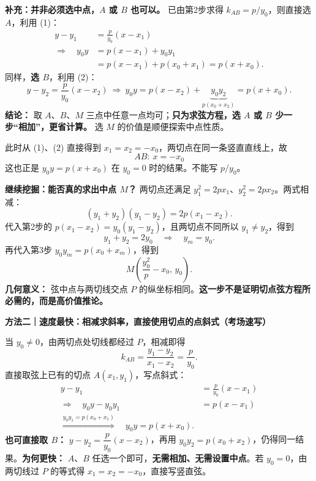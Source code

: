 \begin{proofbox}
\begin{description}[style=nextline,leftmargin=2.8em,labelsep=0.5em,itemsep=0.5em]
\textbf{补充：并非必须选中点，$A$ 或 $B$ 也可以。} 已由第2步求得 $k_{AB}=p/y_0$，则直接选 $A$，利用 (1)：
\[
 \begin{aligned}
 y-y_1&=\frac p{y_0}(x-x_1)\\
 \Longrightarrow\quad y_0y&=p(x-x_1)+y_0y_1\\
 &=p(x-x_1)+p(x_0+x_1)=\boxed{p(x+x_0)}.
 \end{aligned}
\]
同样，\textbf{选 $B$}，利用 (2)：
\[
 y-y_2=\frac p{y_0}(x-x_2)
 \ \Longrightarrow\ y_0y=p(x-x_2)+\underbrace{y_0y_2}_{p(x_0+x_2)}
 =\boxed{p(x+x_0)}.
\]
\textbf{结论：} 取 $A$、$B$、$M$ 三点中任意一点均可；\textbf{只为求弦方程，选 $A$ 或 $B$ 少一步“相加”，更省计算。} 选 $M$ 的价值是顺便探索中点性质。
\item[\textbf{第5步：补上 $y_0=0$ 的竖直弦。}]
此时从 (1)、(2) 直接得到 $x_1=x_2=-x_0$，两切点在同一条竖直直线上，故
\[\boxed{AB:\ x=-x_0}\]
这也正是 $y_0y=p(x+x_0)$ 在 $y_0=0$ 时的结果。不能写 $p/y_0$。
\end{description}

\textbf{继续挖掘：能否真的求出中点 $M$？} 两切点还满足 $y_1^2=2px_1$、$y_2^2=2px_2$。两式相减：
\[
 (y_1+y_2)(y_1-y_2)=2p(x_1-x_2).
\]
代入第2步的 $p(x_1-x_2)=y_0(y_1-y_2)$，且两切点不同所以 $y_1\ne y_2$，得到
\[
 y_1+y_2=2y_0\quad\Longrightarrow\quad\boxed{y_m=y_0}.
\]
再代入第3步 $y_0y_m=p(x_0+x_m)$，得到
\[
 \boxed{M\left(\frac{y_0^2}{p}-x_0,\,y_0\right)}.
\]
\textbf{几何意义：} 弦中点与两切线交点 $P$ 的纵坐标相同。\textbf{这一步不是证明切点弦方程所必需的，而是高价值推论。}

\medskip
\par\noindent\begin{minipage}{\linewidth}
\textbf{\textcolor{CProof}{方法二｜速度最快：相减求斜率，直接使用切点的点斜式（考场速写）}}
\par\smallskip\begin{center}\end{center}\par\smallskip
\end{minipage}\par
当 $y_0\ne0$，由两切点处切线都经过 $P$，相减即得
\[
 k_{AB}=\frac{y_1-y_2}{x_1-x_2}=\frac p{y_0}.
\]
直接取弦上已有的切点 $A(x_1,y_1)$，写点斜式：
\[
 \begin{aligned}
 y-y_1&=\frac p{y_0}(x-x_1)\\
 \Longrightarrow\quad y_0y-y_0y_1&=p(x-x_1)\\
 \overset{y_0y_1=p(x_0+x_1)}{\Longrightarrow}\quad
 \boxed{y_0y=p(x+x_0)}.
 \end{aligned}
\]
\textbf{也可直接取 $B$：} $y-y_2=\dfrac p{y_0}(x-x_2)$，再用 $y_0y_2=p(x_0+x_2)$，仍得同一结果。\textbf{为何更快：} $A$、$B$ 任选一个即可，\textbf{无需相加、无需设置中点}。若 $y_0=0$，由两切线过 $P$ 的等式得 $x_1=x_2=-x_0$，直接写竖直弦。


\end{proofbox}
